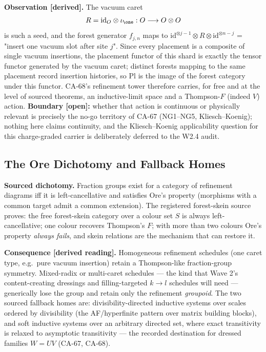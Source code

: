 \textbf{Observation [derived].}  The vacuum caret
\[
  R=\mathrm{id}_O\otimes\iota_{\one}:O\longrightarrow O\otimes O
\]
is such a seed, and the forest generator \(f_{j,n}\) maps to
\(\mathrm{id}^{\otimes j-1}\otimes R\otimes\mathrm{id}^{\otimes n-j}\) =
"insert one vacuum slot after site \(j\)".  Since every placement is a
composite of single vacuum insertions, the placement functor of this shard
is exactly the tensor functor generated by the vacuum caret; distinct
forests mapping to the same placement record insertion histories, so
\(\mathrm{Pl}\) is the image of the forest category under this functor.
CA-68's refinement tower therefore carries, for free and at the level of
sourced theorems, an inductive-limit space and a Thompson-\(F\) (indeed
\(V\)) action.  \textbf{Boundary [open]:} whether that action is continuous
or physically relevant is precisely the no-go territory of CA-67
(NG1--NG5, Kliesch--Koenig); nothing here claims continuity, and the
Kliesch--Koenig applicability question for this charge-graded carrier is
deliberately deferred to the W2.4 audit.

\subsection{The Ore Dichotomy and Fallback Homes}

\textbf{Sourced dichotomy.}  Fraction groups exist for a category of
refinement diagrams iff it is left-cancellative and satisfies Ore's property
(morphisms with a common target admit a common extension).  The registered
forest-skein source proves: the free forest-skein category over a colour set
\(S\) is always left-cancellative; one colour recovers Thompson's \(F\);
with more than two colours Ore's property \emph{always fails}, and skein
relations are the mechanism that can restore it.

\textbf{Consequence [derived reading].}  Homogeneous refinement schedules
(one caret type, e.g.\ pure vacuum insertion) retain a Thompson-like
fraction-group symmetry.  Mixed-radix or multi-caret schedules --- the kind
that Wave 2's content-creating dressings and filling-targeted \(k\to l\)
schedules will need --- generically lose the group and retain only the
refinement \emph{groupoid}.  The two sourced fallback homes are:
divisibility-directed inductive systems over scales ordered by divisibility
(the AF/hyperfinite pattern over matrix building blocks), and soft inductive
systems over an arbitrary directed set, where exact transitivity is relaxed
to asymptotic transitivity --- the recorded destination for dressed families
\(W=UV\) (CA-67, CA-68).

